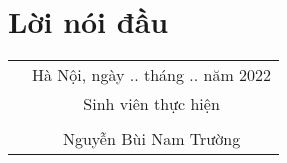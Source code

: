 \newpage
\section*{\centering Lời nói đầu}





\begin{flushright}
	\begin{tabular}{rc}
		& Hà Nội, ngày .. tháng .. năm 2022 \\
		& Sinh viên thực hiện \\	
		\\
		& Nguyễn Bùi Nam Trường \\
	\end{tabular}
\end{flushright}
\newpage